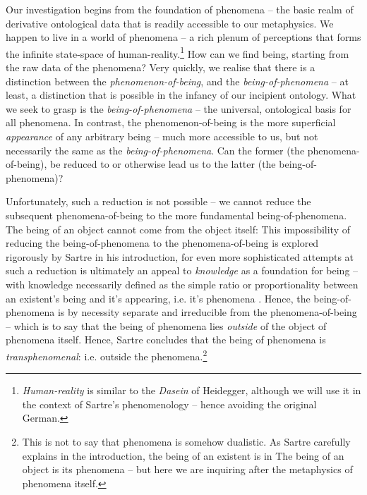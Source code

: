 Our investigation begins from the foundation of phenomena -- the basic realm of derivative ontological data that is readily accessible to our metaphysics. We happen to live in a world of phenomena -- a rich plenum of perceptions that forms the infinite state-space of human-reality.\footnote{\emph{Human-reality} is similar to the \emph{Dasein} of Heidegger, although we will use it in the context of Sartre's phenomenology -- hence avoiding the original German.} How can we find being, starting from the raw data of the phenomena? Very quickly, we realise that there is a distinction between the \emph{phenomenon-of-being}, and the \emph{being-of-phenomena} -- at least, a distinction that is possible in the infancy of our incipient ontology. What we seek to grasp is the \emph{being-of-phenomena} -- the universal, ontological basis for all phenomena. In contrast, the phenomenon-of-being is the more superficial \emph{appearance} of any arbitrary being -- much more accessible to us, but not necessarily the same as the \emph{being-of-phenomena}.  Can the former (the phenomena-of-being), be reduced to or otherwise lead us to the latter (the being-of-phenomena)? 

Unfortunately, such a reduction is not possible -- we cannot reduce the subsequent phenomena-of-being to the more fundamental being-of-phenomena. The being of an object cannot come from the object itself:  This impossibility of reducing the being-of-phenomena to the phenomena-of-being is explored rigorously by Sartre in his introduction, for even more sophisticated attempts at such a reduction is ultimately an appeal to \emph{knowledge} as a foundation for being -- with knowledge necessarily defined as the simple ratio or proportionality between an existent's being and it's appearing, i.e. it's phenomena \autocite[7]{Sartre}. Hence, the being-of-phenomena is by necessity separate and irreducible from the phenomena-of-being -- which is to say that the being of phenomena lies \emph{outside} of the object of phenomena itself.  Hence, Sartre concludes that the being of phenomena is \emph{transphenomenal}: i.e. outside the phenomena.\footnote{This is not to say that phenomena is somehow dualistic. As Sartre carefully explains in the introduction, the being of an existent is in  The being of an object is its phenomena -- but here we are inquiring after the metaphysics of phenomena itself.}

